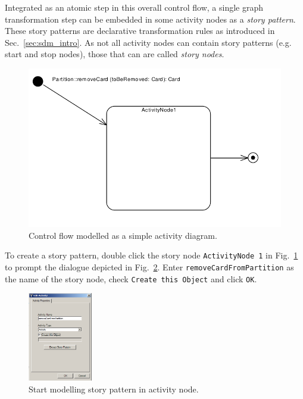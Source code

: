Integrated as an atomic step in this overall control flow, a single graph
transformation step can be embedded in some activity nodes as a \emph{story
pattern}.  These story patterns are declarative transformation rules as introduced in
Sec.~\ref{sec:sdm_intro}.  As not all activity nodes can contain story
patterns (e.g. start and stop nodes), those that can are called \emph{story
nodes}. \clearpage


\begin{figure}[htp]
\begin{center}
  \includegraphics[width=\textwidth]{pics/sdmBilder/removeCard/sdm06RAW.pdf}
  \caption{Control flow modelled as a simple activity diagram.}  
  \label{fig:sdm_complete_control_flow_simple}
\end{center}
\end{figure}

To create a story pattern, double click the story node \texttt{ActivityNode 1}
in Fig.~\ref{fig:sdm_complete_control_flow_simple} to prompt the dialogue
depicted in Fig.~\ref{fig:story_pattern}.  Enter
\texttt{remove\-Card\-From\-Partition} as the name of the story node, check
\texttt{Create this Object} and click \texttt{OK}.

\begin{figure}[hbp]
\begin{center} 
  \includegraphics[width=0.25\textwidth]{pics/sdmBilder/removeCard/sdm07RAW}
  \caption{Start modelling story pattern in activity node.}  
  \label{fig:story_pattern}
\end{center}
\end{figure}

